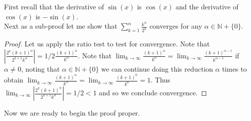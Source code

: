 \documentclass[12pt]{article}
\theoremstyle{homework}
\begin{document}
First recall that the derivative of $\sin(x)$ is $\cos(x)$ and the derivative of$\cos(x)$ is $-\sin(x)$.\\
Next as a sub-proof let me show that $\sum_{k=1}^n \frac{k^\alpha}{2^k}$ converges for any $\alpha\in\mathbb{N}+\{0\}$.
\begin{proof}
Let us apply the ratio test to test for convergence.  Note that $|\frac{2^k(k+1)^\alpha}{2^{k+1}k^\alpha}|=1/2\frac{(k+1)^\alpha}{k^\alpha}$.  Note that $\lim_{k\rightarrow\infty}\frac{(k+1)^\alpha}{k^\alpha}=\lim_{k\rightarrow\infty}\frac{(k+1)^{\alpha-1}}{k^{\alpha-1}}$ if $\alpha\neq 0$, noting that $\alpha\in \mathbb{N}+\{0\}$ we can continue doing this reduction $\alpha$ times to obtain $\lim_{k\rightarrow\infty}\frac{(k+1)^\alpha}{k^\alpha}=\lim_{k\rightarrow\infty}\frac{(k+1)^0}{k^0}=1$.  Thus $\lim_{k\rightarrow\infty}|\frac{2^k(k+1)^\alpha}{2^{k+1}k^\alpha}|=1/2<1$ and so we conclude convergence.
\end{proof}
Now we are ready to begin the proof proper.
\end{document}
